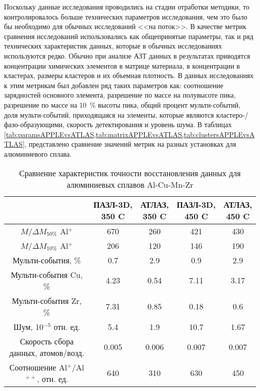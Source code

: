 Поскольку данные исследования проводились на стадии отработки методики, то контролировалось больше технических параметров исследования, чем это было бы необходимо для обычных исследований <<на поток>>. В качестве метрик сравнения исследований использовались как общепринятые параметры, так и ряд технических характеристик данных, которые в обычных исследованиях используются редко. Обычно при анализе АЗТ данных в результатах приводятся концентрации химических элементов в матрице материала, в концентрации в кластерах, размеры кластеров и их объемная плотность. В данных исследованиях к этим метрикам был добавлен ряд таких параметров как: соотношение зарядностей основного элемента, разрешение по массе на полувысоте пика, разрешение по массе на 10~\% высоты пика, общий процент мульти-событий, доля мульти-событий, приходящаяся на элементы, которые являются кластеро-/фазо-образующими, скорость детектирования и уровень шума.  В таблицах \cref{tab:paramsAPPLEvsATLAS,tab:matrixAPPLEvsATLAS,tab:clustersAPPLEvsATLAS}, представлено сравнение значений метрик на разных установках для алюминиевого сплава.

\begin{table} [htbp]
	\centering
	\caption{Сравнение характеристик точности восстановления данных для алюминиевых сплавов Al-Cu-Mn-Zr}
	\label{tab:paramsAPPLEvsATLAS}
	\begin{SingleSpace}
		\begin{tabular} {| c | c | c | c | c |}
			\hline
			{} & \thead{ПАЗЛ-3D, \\350 \textdegree C} & \thead{АТЛАЗ, \\350 \textdegree C} & \thead{ПАЗЛ-3D, \\450 \textdegree C} & \thead{АТЛАЗ, \\450 \textdegree C} \\ \hline
			$M/\Delta M_{50\%}$ Al$^+$ & 670  & 260  & 421  & 430               \\ \hline
			$M/\Delta M_{10\%}$ Al$^+$ & 206  & 120  & 146  & 190               \\ \hline
			Мульти-события, \%         & 0.7  & 2.9  & 0.9  & 2.9               \\ \hline
			Мульти-события Cu, \%      & 4.23 & 0.54 & 7.11 & 3.17              \\ \hline
			Мульти-события Zr, \%      & 7.31 & 0.85 & 0.18 & 0.6               \\ \hline
			Шум, 10$^{-5}$ отн. ед. & 5.4   & 1.9   & 10.7  & 1.67  \\ \hline
			Скорость сбора данных, атомов/возд.        & 0.005 & 0.006 & 0.007 & 0.007 \\ \hline
			Соотношение Al$^+$/Al$^{++}$, отн. ед.    & 640   & 310   & 630   & 450   \\ \hline
		\end{tabular}
	\end{SingleSpace}
\end{table}


